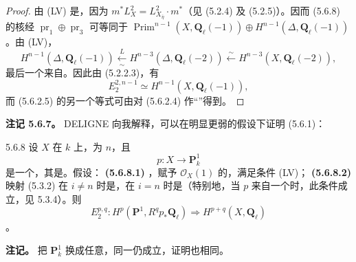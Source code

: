 \begin{proof}
由 (LV) 是，因为 $m^*L_X^2=L_{X_{\bar\eta}}^2\cdot m^*$（见 (5.2.4) 及 (5.2.5)）。因而 (5.6.8) 的核经 $\operatorname{pr}_1\oplus\operatorname{pr}_3$ 可等同于
$\operatorname{Prim}^{n-1}(X,\mathbf Q_\ell(-1))\oplus H^{n-1}(\Delta,\mathbf Q_\ell(-1))$。由 (LV)，
\[H^{n-1}(\Delta,\mathbf Q_\ell(-1))\xleftarrow[\sim]{L}H^{n-3}(\Delta,\mathbf Q_\ell(-2))\xleftarrow{\sim}H^{n-3}(X,\mathbf Q_\ell(-2)),\]
最后一个来自。因此由 (5.2.2.3)，有
\begin{equation}\tag{5.6.6}E_2^{2,n-1}\simeq H^{n-1}(X,\mathbf Q_\ell(-1)),\end{equation}
而 (5.6.2.5) 的另一个等式可由对 (5.6.2.4) 作“”得到。
\end{proof}
\textbf{注记 5.6.7。} DELIGNE 向我解释，可以在明显更弱的假设下证明 (5.6.1)：
\begin{SGAresult}{}{5.6.8}
设 $X$ 在 $k$ 上，为 $n$，且
\[p:X\longrightarrow\mathbf P^1_k\]
是一个，其是。假设：
\textbf{(5.6.8.1)} ，赋予 $\mathscr O_X(1)$ 的，满足条件 (LV)；
\textbf{(5.6.8.2)} 映射 (5.3.2) 在 $i\neq n$ 时是，在 $i=n$ 时是（特别地，当 $p$ 来自一个时，此条件成立，见 5.3.4）。则
\[E_2^{p,q}:H^p(\mathbf P^1,R^qp_*\mathbf Q_\ell)\Longrightarrow H^{p+q}(X,\mathbf Q_\ell)\]
。
\end{SGAresult}
\textbf{注记。} 把 $\mathbf P^1_k$ 换成任意，同一仍成立，证明也相同。
